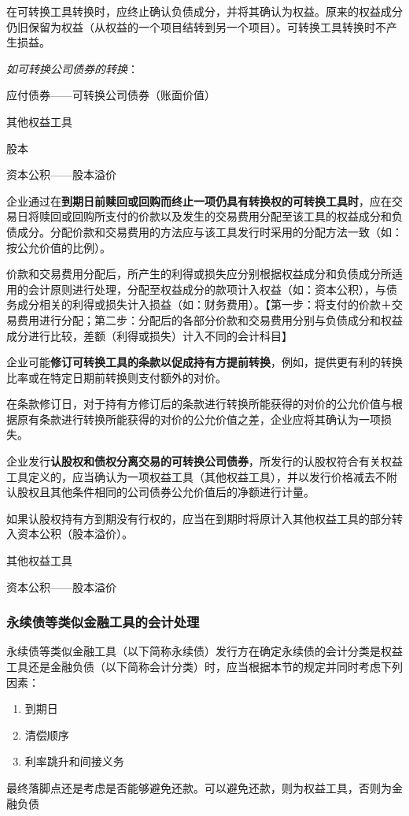 \documentclass[UTF8,12pt]{ctexart}
\newenvironment{Dr}{%
	\begin{list}{}%
		{
			\setlength{\leftmargin}{2em}
			\setlength{\labelwidth}{2em}
			\setlength{\labelsep}{0pt}
			\setlength{\itemindent}{0pt}
			\setlength{\listparindent}{0pt}
			\setlength{\parsep}{0pt}
			\setlength{\topsep}{0pt}
		}
		\item[\textbf{借：}]
	}{%
	\end{list}
}
\newenvironment{Cr}{%
	\begin{list}{}%
		{
			\setlength{\leftmargin}{2em}
			\setlength{\labelwidth}{2em}
			\setlength{\labelsep}{0pt}
			\setlength{\itemindent}{0pt}
			\setlength{\listparindent}{0pt}
			\setlength{\parsep}{0pt}
			\setlength{\topsep}{0pt}
		}
		\item[\textbf{贷：}]
	}{%
	\end{list}
}
\numberwithin{equation}{section} %
\numberwithin{figure}{section}
\numberwithin{table}{section}
\begin{document}
	在可转换工具转换时，应终止确认负债成分，并将其确认为权益。原来的权益成分仍旧保留为权益（从权益的一个项目结转到另一个项目）。可转换工具转换时不产生损益。
	
	\textit{如可转换公司债券的转换}：
	
	\begin{Dr}
		应付债券——可转换公司债券（账面价值）
		
		其他权益工具
	\end{Dr}
	\begin{Cr}
		股本
		
		资本公积——股本溢价
	\end{Cr}
	
	
	企业通过在\textbf{到期日前赎回或回购而终止一项仍具有转换权的可转换工具时}，应在交易日将赎回或回购所支付的价款以及发生的交易费用分配至该工具的权益成分和负债成分。分配价款和交易费用的方法应与该工具发行时采用的分配方法一致（如：按公允价值的比例）。
	
	价款和交易费用分配后，所产生的利得或损失应分别根据权益成分和负债成分所适用的会计原则进行处理，分配至权益成分的款项计入权益（如：资本公积），与债务成分相关的利得或损失计入损益（如：财务费用）。【第一步：将支付的价款＋交易费用进行分配；第二步：分配后的各部分价款和交易费用分别与负债成分和权益成分进行比较，差额（利得或损失）计入不同的会计科目】
	
	企业可能\textbf{修订可转换工具的条款以促成持有方提前转换}，例如，提供更有利的转换比率或在特定日期前转换则支付额外的对价。
	
	在条款修订日，对于持有方修订后的条款进行转换所能获得的对价的公允价值与根据原有条款进行转换所能获得的对价的公允价值之差，企业应将其确认为一项损失。
	
	企业发行\textbf{认股权和债权分离交易的可转换公司债券}，所发行的认股权符合有关权益工具定义的，应当确认为一项权益工具（其他权益工具），并以发行价格减去不附认股权且其他条件相同的公司债券公允价值后的净额进行计量。
	
	如果认股权持有方到期没有行权的，应当在到期时将原计入其他权益工具的部分转入资本公积（股本溢价）。
	
	\begin{Dr}
		其他权益工具
	\end{Dr}
	\begin{Cr}
		资本公积——股本溢价
	\end{Cr}

	
	
	\subsubsection{永续债等类似金融工具的会计处理}
	永续债等类似金融工具（以下简称永续债）发行方在确定永续债的会计分类是权益工具还是金融负债（以下简称会计分类）时，应当根据本节的规定并同时考虑下列因素：
	\begin{enumerate}
		\item 到期日
		
		\item 清偿顺序
		
		\item 利率跳升和间接义务
	\end{enumerate}
	最终落脚点还是考虑是否能够避免还款。可以避免还款，则为权益工具，否则为金融负债
	
\end{document}
